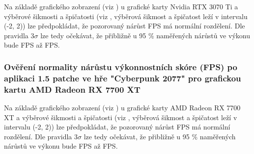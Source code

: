 Na základě grafického zobrazení (viz ) u grafické karty Nvidia RTX 3070 Ti a výběrové šikmosti a špičatosti (viz ,
výběrová šikmost a špičatost leží v intervalu (-2, 2)) lze předpokládat, že pozorovaný nárůst FPS má normální rozdělení. Dle pravidla 3$\sigma$ lze tedy očekávat,
že přibližně u 95 \% naměřených nárůstů ve výkonu bude  FPS až  FPS\@.

\subsubsection*{Ověření normality nárůstu výkonnostních skóre (FPS) po aplikaci 1.5 patche ve hře "Cyberpunk 2077" pro grafickou kartu AMD Radeon RX 7700 XT}

Na základě grafického zobrazení (viz ) u grafické karty AMD Radeon RX 7700 XT a výběrové šikmosti a špičatosti (viz ,
výběrová šikmost a špičatost leží v intervalu (-2, 2)) lze předpokládat, že pozorovaný nárůst FPS má normální rozdělení. Dle pravidla 3$\sigma$ lze tedy očekávat,
že přibližně u 95 \% naměřených nárůstů ve výkonu bude  FPS až  FPS\@.

\endinput